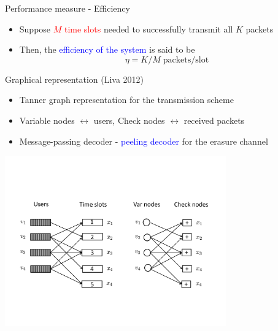 \begin{frame}{Performance measure - Efficiency}
 \begin{itemize}
    \item Suppose \textcolor{red}{$M$ time slots} needed to successfully transmit all $K$ packets
\vspace{6mm}
    \item Then, the \textcolor{blue}{efficiency of the system} is said to be \[\eta = K/M \; \text{packets/slot} \]
 \end{itemize}
\end{frame}
\begin{frame}{Graphical representation (Liva 2012)}
\begin{itemize}
\item Tanner graph representation for the transmission scheme
\item Variable nodes $\leftrightarrow$ users, Check nodes $\leftrightarrow$ received packets
\item Message-passing decoder - \textcolor{blue}{peeling decoder} for the erasure channel
\end{itemize}
\begin{center}
\includegraphics[width=3.75in]{./Figures/iterativeinterferencecancellation2}
\end{center}

\end{frame}
